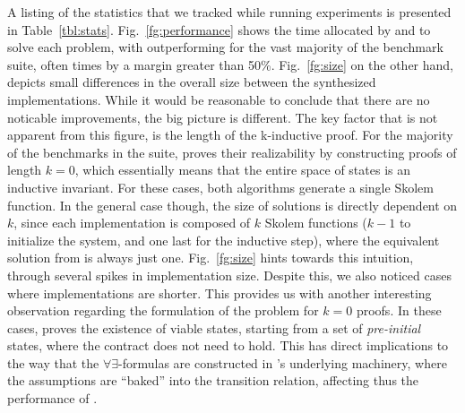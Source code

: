\begin{table}[!t]
\centering
\caption{Benchmark Statistics}
\label{tbl:stats}
\end{table}

A listing of the statistics that we tracked while running experiments is
presented in Table~\ref{tbl:stats}.
Fig.~\ref{fg:performance} shows the time allocated by \jsyn and \jsynvg to solve each problem, with \jsynvg
outperforming \jsyn for the vast majority of the benchmark suite, often times by a margin greater than
50\%. Fig.~\ref{fg:size} on the other hand, depicts small differences in the
overall size between the synthesized implementations. While it would be
reasonable to conclude that there are no noticable improvements, the big picture is different. The key factor that is not apparent from this figure, is the length of the k-inductive proof. For the majority of the benchmarks in the suite, \jsyn proves their realizability by constructing proofs of length $k=0$, which essentially means that the entire space of states is an inductive invariant. For these cases, both algorithms generate a single Skolem function. In the general case though, the size of \jsyn solutions is directly
dependent on $k$, since each implementation is composed of $k$ Skolem
functions ($k-1$ to initialize the system, and one last for the inductive step),
where the equivalent solution from \jsynvg is always just one.
Fig.~\ref{fg:size} hints towards this intuition, through several spikes
in \jsyn implementation size. Despite this, we also noticed cases where \jsyn
implementations are shorter. This provides us with another interesting
observation regarding the formulation of the problem for $k=0$ proofs. In
these cases, \jsyn proves the existence of viable states, starting from a set
of \textit{pre-initial} states, where the contract does not need to hold. This
has direct implications to the way that the $\forall\exists$-formulas are
constructed in \jsyn's underlying machinery, where the assumptions are ``baked''
into the transition relation, affecting thus the performance of \aeval.

